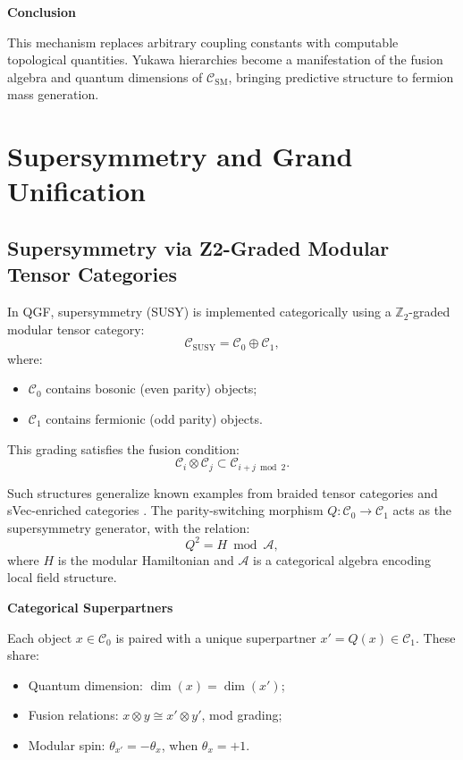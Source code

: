 \documentclass[11pt]{article}
\def\texorpdfstring#1#2{#2}
\begin{document}
\vspace{0.5em}
\noindent\textbf{Conclusion}

This mechanism replaces arbitrary coupling constants with computable topological quantities. Yukawa hierarchies become a manifestation of the fusion algebra and quantum dimensions of \( \mathcal{C}_{\text{SM}} \), bringing predictive structure to fermion mass generation.



\section{Supersymmetry and Grand Unification}

\subsection{\texorpdfstring{Supersymmetry via \( \mathbb{Z}_2 \)-Graded Modular Tensor Categories}{Supersymmetry via Z2-Graded Modular Tensor Categories}}


In QGF, supersymmetry (SUSY) is implemented categorically using a \( \mathbb{Z}_2 \)-graded modular tensor category:
\[
\mathcal{C}_{\text{SUSY}} = \mathcal{C}_0 \oplus \mathcal{C}_1,
\]
where:
\begin{itemize}
  \item \( \mathcal{C}_0 \) contains bosonic (even parity) objects;
  \item \( \mathcal{C}_1 \) contains fermionic (odd parity) objects.
\end{itemize}

This grading satisfies the fusion condition:
\[
\mathcal{C}_i \otimes \mathcal{C}_j \subset \mathcal{C}_{i+j \bmod 2}.
\]

Such structures generalize known examples from braided tensor categories and sVec-enriched categories \cite{Deligne2002, Etingof2005}. The parity-switching morphism \( Q: \mathcal{C}_0 \rightarrow \mathcal{C}_1 \) acts as the supersymmetry generator, with the relation:
\[
Q^2 = H \bmod \mathcal{A},
\]
where \( H \) is the modular Hamiltonian and \( \mathcal{A} \) is a categorical algebra encoding local field structure.

\vspace{0.5em}
\noindent\textbf{Categorical Superpartners}

Each object \( x \in \mathcal{C}_0 \) is paired with a unique superpartner \( x' = Q(x) \in \mathcal{C}_1 \). These share:
\begin{itemize}
  \item Quantum dimension: \( \dim(x) = \dim(x') \);
  \item Fusion relations: \( x \otimes y \cong x' \otimes y' \), mod grading;
  \item Modular spin: \( \theta_{x'} = -\theta_x \), when \( \theta_x = +1 \).
\end{itemize}
\end{document}
